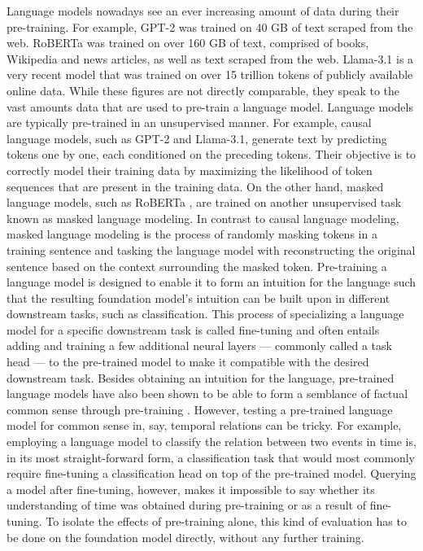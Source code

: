 \documentclass[11pt]{article}
\begin{document}
Language models nowadays see an ever increasing amount of data during their pre-training. For example, GPT-2 \citep{gpt2} was trained on 40 GB of text scraped from the web. RoBERTa \citep{roberta} was trained on over 160 GB of text, comprised of books, Wikipedia and news articles, as well as text scraped from the web. Llama-3.1 \citep{llama3} is a very recent model that was trained on over 15 trillion tokens of publicly available online data. While these figures are not directly comparable, they speak to the vast amounts data that are used to pre-train a language model. Language models are typically pre-trained in an unsupervised manner. For example, causal language models, such as GPT-2 \citep{gpt2} and Llama-3.1, \citep{llama3} generate text by predicting tokens one by one, each conditioned on the preceding tokens. Their objective is to correctly model their training data by maximizing the likelihood of token sequences that are present in the training data. On the other hand, masked language models, such as RoBERTa \citep{roberta}, are trained on another unsupervised task known as masked language modeling. In contrast to causal language modeling, masked language modeling is the process of randomly masking tokens in a training sentence and tasking the language model with reconstructing the original sentence based on the context surrounding the masked token. Pre-training a language model is designed to enable it to form an intuition for the language such that the resulting foundation model's intuition can be built upon in different downstream tasks, such as classification. This process of specializing a language model for a specific downstream task is called fine-tuning and often entails adding and training a few additional neural layers --- commonly called a task head --- to the pre-trained model to make it compatible with the desired downstream task. Besides obtaining an intuition for the language, pre-trained language models have also been shown to be able to form a semblance of factual common sense through pre-training \citep{evaluating}. However, testing a pre-trained language model for common sense in, say, temporal relations can be tricky. For example, employing a language model to classify the relation between two events in time is, in its most straight-forward form, a classification task that would most commonly require fine-tuning a classification head on top of the pre-trained model. Querying a model after fine-tuning, however, makes it impossible to say whether its understanding of time was obtained during pre-training or as a result of fine-tuning. To isolate the effects of pre-training alone, this kind of evaluation has to be done on the foundation model directly, without any further training.
\end{document}

